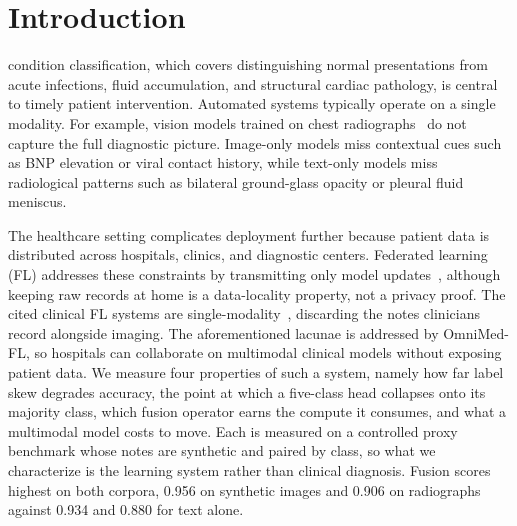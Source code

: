 \documentclass[letterpaper, conference]{IEEEtran}
\begin{document}
\section{Introduction}

 condition classification, which covers distinguishing
normal presentations from acute infections, fluid accumulation, and structural
cardiac pathology, is central to timely patient intervention. Automated systems
typically operate on a single modality. For example, vision models trained on chest
radiographs~\cite{Irvin2019} do not capture the full diagnostic picture. Image-only models miss
contextual cues such as BNP elevation or viral contact history, while text-only
models miss radiological patterns such as bilateral ground-glass opacity or pleural
fluid meniscus.

The healthcare setting complicates deployment further because patient data is
distributed across hospitals, clinics, and diagnostic centers.
Federated learning (FL) addresses these constraints by
transmitting only model updates~\cite{McMahan2017}, although keeping raw records at
home is a data-locality property, not a privacy proof. The cited clinical FL
systems are single-modality~\cite{Sheller2020,Dou2021},
discarding the notes clinicians record alongside imaging. The aforementioned lacunae is addressed by OmniMed-FL, so hospitals can collaborate on multimodal clinical models without
exposing patient data. We measure four properties of such a system, namely how far
label skew degrades accuracy, the point at which a five-class head collapses onto its
majority class, which fusion operator earns the compute it consumes, and what a
multimodal model costs to move. Each is measured on a controlled proxy benchmark
whose notes are synthetic and paired by class, so what we characterize is the
learning system rather than clinical diagnosis. Fusion scores
highest on both corpora, 0.956 on synthetic images and 0.906 on radiographs against
0.934 and 0.880 for text alone.
\end{document}
